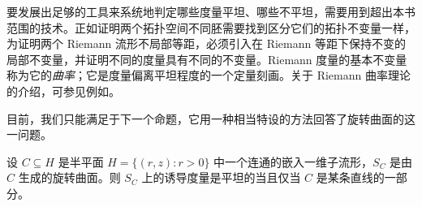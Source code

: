 \documentclass[../../main.tex]{subfiles}
\begin{document}
要发展出足够的工具来系统地判定哪些度量平坦、哪些不平坦，需要用到超出本书范围的技术。正如证明两个拓扑空间不同胚需要找到区分它们的拓扑不变量一样，为证明两个 Riemann 流形不局部等距，必须引入在 Riemann 等距下保持不变的局部不变量，并证明不同的度量具有不同的不变量。Riemann 度量的基本不变量称为它的\emph{曲率}；它是度量偏离平坦程度的一个定量刻画。关于 Riemann 曲率理论的介绍，可参见例如\cite{LeeRM}。

目前，我们只能满足于下一个命题，它用一种相当特设的方法回答了旋转曲面的这一问题。

\begin{proposition}[旋转曲面的平坦性判别法]\label{proposition:ch13-revolution-flat}
设 $C\subseteq H$ 是半平面 $H=\{(r,z):r>0\}$ 中一个连通的嵌入一维子流形，$S_C$ 是由 $C$ 生成的旋转曲面。则 $S_C$ 上的诱导度量是平坦的当且仅当 $C$ 是某条直线的一部分。
\end{proposition}
\end{document}
